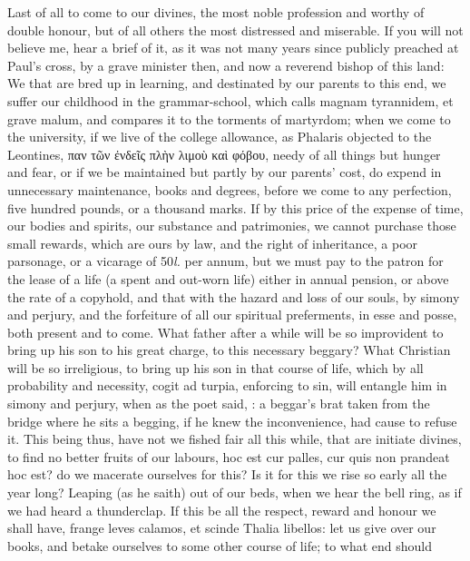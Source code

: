 {{Last of all to come to our divines, the most noble profession and
worthy of double honour, but of all others the most distressed and
miserable. If you will not believe me, hear a brief of it, as it was
not many years since publicly preached at Paul's cross, by a
grave minister then, and now a reverend bishop of this land: We that
are bred up in learning, and destinated by our parents to this end, we
suffer our childhood in the grammar-school, which \Austin{} calls magnam
tyrannidem, et grave malum, and compares it to the torments of
martyrdom; when we come to the university, if we live of the college
allowance, as Phalaris objected to the Leontines, \textgreek{παν τῶν ἐνδεῖς πλὴν
λιμοὺ καὶ φόβου}, needy of all things but hunger and fear, or if we be
maintained but partly by our parents' cost, do expend in unnecessary
maintenance, books and degrees, before we come to any perfection, five
hundred pounds, or a thousand marks. If by this price of the expense of
time, our bodies and spirits, our substance and patrimonies, we cannot
purchase those small rewards, which are ours by law, and the right of
inheritance, a poor parsonage, or a vicarage of 50\emph{l.} per annum, but
we must pay to the patron for the lease of a life (a spent and out-worn
life) either in annual pension, or above the rate of a copyhold, and
that with the hazard and loss of our souls, by simony and perjury, and
the forfeiture of all our spiritual preferments, in esse and posse,
both present and to come. What father after a while will be so
improvident to bring up his son to his great charge, to this necessary
beggary? What Christian will be so irreligious, to bring up his son in
that course of life, which by all probability and necessity, cogit ad
turpia, enforcing to sin, will entangle him in simony and perjury, when
as the poet said, : a
beggar's brat taken from the bridge where he sits a begging, if he knew
the inconvenience, had cause to refuse it. This being thus, have not we
fished fair all this while, that are initiate divines, to find no
better fruits of our labours,  hoc est cur palles, cur quis non
prandeat hoc est? do we macerate ourselves for this? Is it for this we
rise so early all the year long? Leaping (as he saith) out of our
beds, when we hear the bell ring, as if we had heard a thunderclap. If
this be all the respect, reward and honour we shall have, frange
leves calamos, et scinde Thalia libellos: let us give over our books,
and betake ourselves to some other course of life; to what end should
}}

